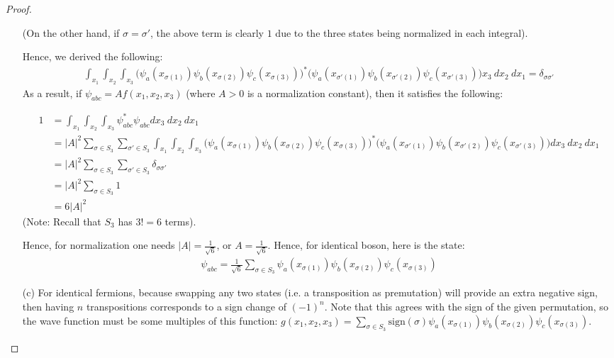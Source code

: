 \documentclass{article}
\begin{document}
\begin{proof}
\begin{itemize}
        (On the other hand, if $\sigma=\sigma'$, the above term is clearly $1$ due to the three states being normalized in each integral).

        Hence, we derived the following:
        \begin{align}
            \int_{x_1}\int_{x_2}\int_{x_3}\big(\psi_a(x_{\sigma(1)})\psi_b(x_{\sigma(2)})\psi_c(x_{\sigma(3)})\big)^* \big(\psi_a(x_{\sigma'(1)})\psi_b(x_{\sigma'(2)})\psi_c(x_{\sigma'(3)})\big)x_3\ dx_2\ dx_1=\delta_{\sigma\sigma'}
        \end{align}
        As a result, if $\psi_{abc} = Af(x_1,x_2,x_3)$ (where $A>0$ is a normalization constant), then it satisfies the following:

        \begin{align}
            1 &= \int_{x_1}\int_{x_2}\int_{x_3}\psi_{abc}^*\psi_{abc}dx_3\ dx_2\ dx_1\\
            &= |A|^2\sum_{\sigma\in S_3}\sum_{\sigma'\in S_3}\int_{x_1}\int_{x_2}\int_{x_3}\big(\psi_a(x_{\sigma(1)})\psi_b(x_{\sigma(2)})\psi_c(x_{\sigma(3)})\big)^* \big(\psi_a(x_{\sigma'(1)})\psi_b(x_{\sigma'(2)})\psi_c(x_{\sigma'(3)})\big)dx_3\ dx_2\ dx_1\\
            &= |A|^2\sum_{\sigma \in S_3}\sum_{\sigma'\in S_3}\delta_{\sigma\sigma'}\\
            &= |A|^2 \sum_{\sigma\in S_3}1\\
            &= 6|A|^2
        \end{align}
        (Note: Recall that $S_3$ has $3!=6$ terms).

        Hence, for normalization one needs $|A| = \frac{1}{\sqrt{6}}$, or $A=\frac{1}{\sqrt{6}}$. Hence, for identical boson, here is the state:
        \begin{align}
            \psi_{abc} = \frac{1}{\sqrt{6}}\sum_{\sigma\in S_3}\psi_a(x_{\sigma(1)})\psi_b(x_{\sigma(2)})\psi_c(x_{\sigma(3)})
        \end{align}

        \hfil

        \item[(c)]For identical fermions, because swapping any two states (i.e. a transposition as premutation) will provide an extra negative sign, then having $n$ transpositions corresponds to a sign change of $(-1)^n$. Note that this agrees with the sign of the given permutation, so the wave function must be some multiples of this function: $g(x_1,x_2,x_3) = \sum_{\sigma\in S_3}\textrm{sign}(\sigma)\psi_a(x_{\sigma(1)})\psi_b(x_{\sigma(2)})\psi_c(x_{\sigma(3)})$.
        

\end{itemize}
\end{proof}
\end{document}
